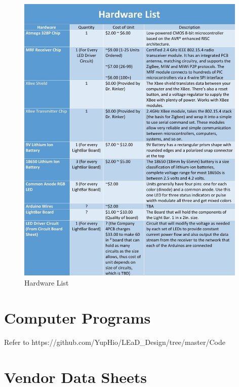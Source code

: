 \documentclass[12pt]{article}
\begin{document}
{{{{			\begin{figure}[ht!]
				\centering
				\includegraphics[width=110mm]{assets/HardwareList.jpg}
				\caption{Hardware List \label{overflow}}
			\end{figure}
		
		\clearpage
	
	\section{Computer Programs}
	
		Refer to https://github.com/YupHio/LEaD\_Design/tree/master/Code

	
	\newpage
	
	\section{Vendor Data Sheets}
	
}}}}
\end{document}
